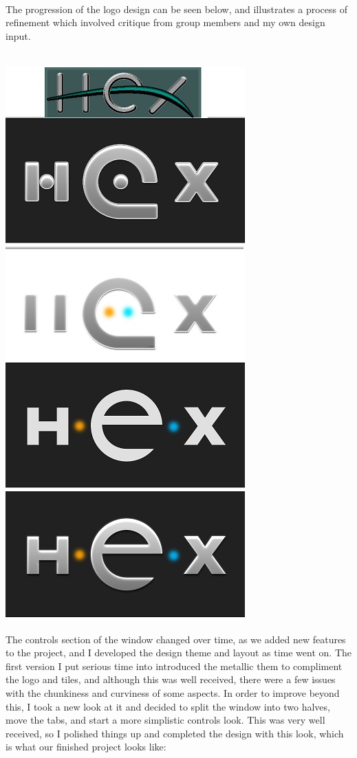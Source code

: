 \documentclass[10pt,a4paper]{article}
\begin{document}
\\
The progression of the logo design can be seen below, and illustrates a process of refinement which involved critique from group members and my own design input.\\
\\
\begin{center}
\includegraphics[scale=0.5]{logoprogression.jpg}
\end{center}
The controls section of the window changed over time, as we added new features to the project, and I developed the design theme and layout as time went on. The first version I put serious time into introduced the metallic them to compliment the logo and tiles, and although this was well received, there were a few issues with the chunkiness and curviness of some aspects. In order to improve beyond this, I took a new look at it and decided to split the window into two halves, move the tabs, and start a more simplistic controls look. This was very well received, so I polished things up and completed the design with this look, which is what our finished project looks like:
\end{document}
